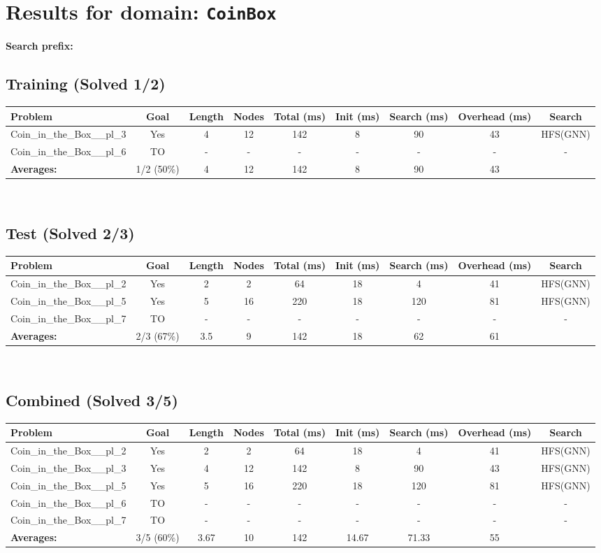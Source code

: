 \documentclass{article}
\begin{document}
\section*{Results for domain: \texttt{CoinBox}}
\textbf{Search prefix:} 
\\[0.5cm]
\subsection*{Training (Solved 1/2)}
\begin{tabular}{lcccccccc}
\toprule
Problem & Goal & Length & Nodes & Total (ms) & Init (ms) & Search (ms) & Overhead (ms) & Search \\
\midrule
Coin\_in\_the\_Box\_\_pl\_3 & Yes & 4 & 12 & 142 & 8 & 90 & 43 & HFS(GNN) \\
Coin\_in\_the\_Box\_\_pl\_6 & TO & - & - & - & - & - & - & - \\
\textbf{Averages:} & 1/2 (50\%) & 4 & 12 & 142 & 8 & 90 & 43 & \\
\bottomrule
\end{tabular}
\\[0.7cm]
\subsection*{Test (Solved 2/3)}
\begin{tabular}{lcccccccc}
\toprule
Problem & Goal & Length & Nodes & Total (ms) & Init (ms) & Search (ms) & Overhead (ms) & Search \\
\midrule
Coin\_in\_the\_Box\_\_pl\_2 & Yes & 2 & 2 & 64 & 18 & 4 & 41 & HFS(GNN) \\
Coin\_in\_the\_Box\_\_pl\_5 & Yes & 5 & 16 & 220 & 18 & 120 & 81 & HFS(GNN) \\
Coin\_in\_the\_Box\_\_pl\_7 & TO & - & - & - & - & - & - & - \\
\textbf{Averages:} & 2/3 (67\%) & 3.5 & 9 & 142 & 18 & 62 & 61 & \\
\bottomrule
\end{tabular}
\\[0.7cm]
\subsection*{Combined (Solved 3/5)}
\begin{tabular}{lcccccccc}
\toprule
Problem & Goal & Length & Nodes & Total (ms) & Init (ms) & Search (ms) & Overhead (ms) & Search \\
\midrule
Coin\_in\_the\_Box\_\_pl\_2 & Yes & 2 & 2 & 64 & 18 & 4 & 41 & HFS(GNN) \\
Coin\_in\_the\_Box\_\_pl\_3 & Yes & 4 & 12 & 142 & 8 & 90 & 43 & HFS(GNN) \\
Coin\_in\_the\_Box\_\_pl\_5 & Yes & 5 & 16 & 220 & 18 & 120 & 81 & HFS(GNN) \\
Coin\_in\_the\_Box\_\_pl\_6 & TO & - & - & - & - & - & - & - \\
Coin\_in\_the\_Box\_\_pl\_7 & TO & - & - & - & - & - & - & - \\
\textbf{Averages:} & 3/5 (60\%) & 3.67 & 10 & 142 & 14.67 & 71.33 & 55 & \\
\bottomrule
\end{tabular}
\\[0.7cm]
\end{document}
